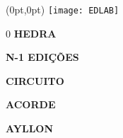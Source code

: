 \begin{textblock*}{5.625in}(0pt,0pt)%
\vspace*{-3cm}
\hspace*{-2.1cm}\texttt{[image: EDLAB]}
\end{textblock*}

\pagebreak

\pagestyle{indice}

{}

\vspace{1.2cm}

{\LARGE

\hspace*{6.8cm}0\pageref{hedra} \textbf{HEDRA}

\hspace*{6.8cm}\pageref{n-1} \textbf{N-1 EDIÇÕES}

\hspace*{6.8cm}\pageref{circuito} \textbf{CIRCUITO}

\hspace*{6.8cm}\pageref{acorde} \textbf{ACORDE}

\hspace*{6.8cm}\pageref{ayllon} \textbf{AYLLON}\\






}

